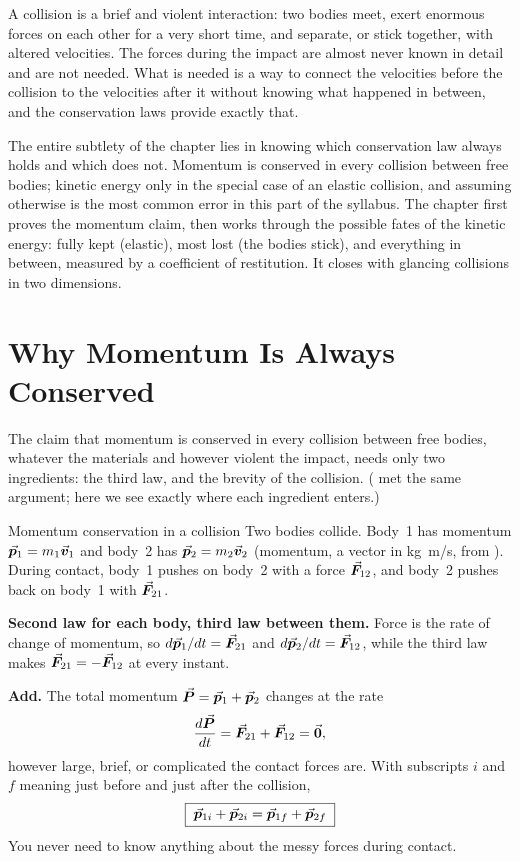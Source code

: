
A collision is a brief and violent interaction: two bodies meet, exert enormous forces on each other for a
very short time, and separate, or stick together, with altered velocities. The forces during the impact are
almost never known in detail and are not needed. What is needed is a way to connect the velocities before
the collision to the velocities after it without knowing what happened in between, and the conservation laws
provide exactly that.

The entire subtlety of the chapter lies in knowing which conservation law always holds and which does
not. Momentum is conserved in every collision between free bodies; kinetic energy only in the special
case of an elastic collision, and assuming otherwise is the most common error in this part of the
syllabus. The chapter first proves the momentum claim, then works through the possible fates of the
kinetic energy: fully kept (elastic), most lost (the bodies stick), and everything in between, measured
by a coefficient of restitution. It closes with glancing collisions in two dimensions.

\section{Why Momentum Is Always Conserved}

The claim that momentum is conserved in every collision between free bodies, whatever the materials and
however violent the impact, needs only two ingredients: the third law, and the brevity of the collision.
( met the same argument; here we see exactly where each ingredient enters.)

\begin{derivbox}{Momentum conservation in a collision}
Two bodies collide. Body~1 has momentum $\vec{\bm{p}}_1=m_1\vec{\bm{v}}_1$ and body~2 has $\vec{\bm{p}}_2=m_2\vec{\bm{v}}_2$ (momentum, a
vector in \si{kg.m/s}, from ). During contact, body~1 pushes on body~2 with a force
$\vec{\bm{F}}_{12}$, and body~2 pushes back on body~1 with $\vec{\bm{F}}_{21}$.

 \textbf{Second law for each body, third law between them.} Force is the rate of change of
momentum, so $d\vec{\bm{p}}_1/dt=\vec{\bm{F}}_{21}$ and $d\vec{\bm{p}}_2/dt=\vec{\bm{F}}_{12}$, while the third law makes
$\vec{\bm{F}}_{21}=-\vec{\bm{F}}_{12}$ at every instant.

 \textbf{Add.} The total momentum $\vec{\bm{P}}=\vec{\bm{p}}_1+\vec{\bm{p}}_2$ changes at the rate
\[
\frac{d\vec{\bm{P}}}{dt}=\vec{\bm{F}}_{21}+\vec{\bm{F}}_{12}=\vec{\bm{0}},
\]
however large, brief, or complicated the contact forces are. With subscripts $i$ and $f$ meaning just
before and just after the collision,
\[
\boxed{\;\vec{\bm{p}}_{1i}+\vec{\bm{p}}_{2i}=\vec{\bm{p}}_{1f}+\vec{\bm{p}}_{2f}\;}
\]
You never need to know anything about the messy forces during contact.
\end{derivbox}

